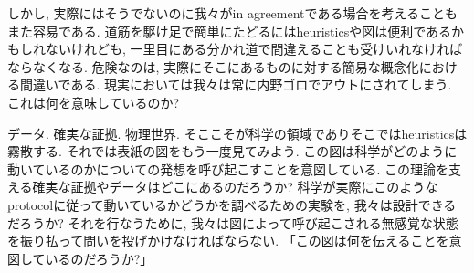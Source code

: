 \documentclass[a4paper]{ltjsbook}
\theoremstyle{remark}
\theoremstyle{definition}
\begin{document}
しかし, 実際にはそうでないのに我々がin agreementである場合を考えることもまた容易である. 道筋を駆け足で簡単にたどるにはheuristicsや図は便利であるかもしれないけれども, 一里目にある分かれ道で間違えることも受けいれなければならなくなる.
危険なのは, 実際にそこにあるものに対する簡易な概念化における間違いである. 現実においては我々は常に内野ゴロでアウトにされてしまう. これは何を意味しているのか?

データ. 確実な証拠. 物理世界. そここそが科学の領域でありそこではheuristicsは霧散する. それでは表紙の図をもう一度見てみよう. 
この図は科学がどのように動いているのかについての発想を呼び起こすことを意図している. この理論を支える確実な証拠やデータはどこにあるのだろうか? 科学が実際にこのようなprotocolに従って動いているかどうかを調べるための実験を, 我々は設計できるだろうか? それを行なうために, 我々は図によって呼び起こされる無感覚な状態を振り払って問いを投げかけなければならない. 「この図は何を伝えることを意図しているのだろうか?」
\end{document}
